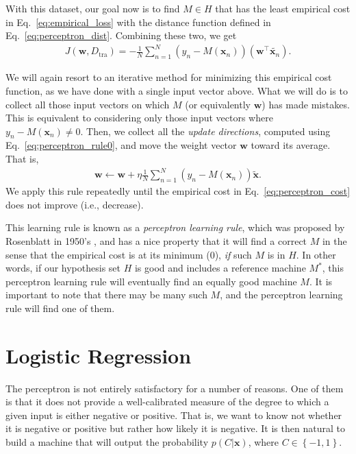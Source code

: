 \documentclass{report}
\newcommand{\vect}[1]{\mathbf{#1}}
\newcommand{\vx}[0]{\vect{x}}
\newcommand{\vw}[0]{\vect{w}}
\begin{document}
With this dataset, our goal now is to find $M \in H$ that has the least
empirical cost in Eq.~\eqref{eq:empirical_loss} with the distance function
defined in Eq.~\eqref{eq:perceptron_dist}. Combining these two, we get
\begin{align}
    \label{eq:perceptron_cost}
    J(\vw, D_{\text{tra}}) = -\frac{1}{N} \sum_{n=1}^N 
    \left( y_n - M(\vx_n) \right) 
    \left(\vw^\top \tilde{\vx_n}\right).
\end{align}

We will again resort to an iterative method for minimizing this empirical cost
function, as we have done with a single input vector above. What we will do is
to collect all those input vectors on which $M$ (or equivalently $\vw$) has made
mistakes. This is equivalent to considering only those input vectors where
$y_n-M(\vx_n) \neq 0$. Then, we collect all the {\it update directions},
computed using Eq.~\eqref{eq:perceptron_rule0}, and move the weight vector
$\vw$ toward its average. That is,
\begin{align}
    \label{eq:perceptron_rule1}
    \vw \leftarrow \vw + \eta \frac{1}{N} \sum_{n=1}^N \left( y_n - M(\vx_n)\right) \tilde{\vx}.
\end{align}
We apply this rule repeatedly until the empirical cost in
Eq.~\eqref{eq:perceptron_cost} does not improve (i.e., decrease). 

This learning rule is known as a {\it perceptron learning rule}, which was
proposed by Rosenblatt in 1950's \cite{Rosenblatt1962}, and has a nice property
that it will find a correct $M$ in the sense that the empirical cost is at its
minimum (0), {\it if} such $M$ is in $H$. In other words, if our hypothesis set
$H$ is good and includes a reference machine $M^*$, this perceptron learning
rule will eventually find an equally good machine $M$. It is important to note
that there may be many such $M$, and the perceptron learning rule will find one
of them. 


\section{Logistic Regression}
\label{sec:logreg}

The perceptron is not entirely satisfactory for a number of reasons. One
of them is that it does not provide a well-calibrated measure of the degree to
which a given input is either negative or positive. That is, we want to know not
whether it is negative or positive but rather how likely it is negative. It is
then natural to build a machine that will output the probability $p(C|\vx)$,
where $C \in \left\{ -1, 1\right\}$.
\end{document}
